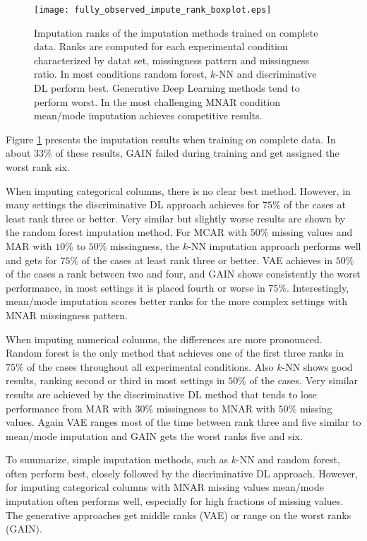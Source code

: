 \begin{figure}\centering
    \texttt{[image: fully\_observed\_impute\_rank\_boxplot.eps]}
    \caption[Imputation Ranks - Fully Observed]{Imputation ranks of the  imputation methods trained on complete data. Ranks are computed for each experimental condition characterized by datat set, missingness pattern and missingness ratio. In most conditions random forest, $k$-NN and discriminative DL perform best. Generative Deep Learning methods tend to perform worst. In the most challenging MNAR condition mean/mode imputation achieves competitive results.
	}
	\label{fig:fully_observed_impute_rank_boxplot}
\end{figure}


Figure \ref{fig:fully_observed_impute_rank_boxplot} presents the imputation results when training on complete data. In about $33\%$ of these results, GAIN failed during training and get assigned the worst rank six.

When imputing categorical columns, there is no clear best method. However, in many settings the discriminative DL approach achieves for $75\%$ of the cases at least rank three or better. Very similar but slightly worse results are shown by the random forest imputation method. For MCAR with $50\%$ missing values and MAR with $10\%$ to $50\%$ missingness, the $k$-NN imputation approach performs well and gets for $75\%$ of the cases at least rank three or better. VAE achieves in $50\%$ of the cases a rank between two and four, and GAIN shows consistently the worst performance, in most settings it is placed fourth or worse in $75\%$. Interestingly, mean/mode imputation scores better ranks for the more complex settings with MNAR missingness pattern.

When imputing numerical columns, the differences are more pronounced. Random forest is the only method that achieves one of the first three ranks in $75\%$ of the cases throughout all experimental conditions. Also $k$-NN shows good results, ranking second or third in most settings in $50\%$ of the cases. Very similar results are achieved by the discriminative DL method that tends to lose performance from MAR with $30\%$ missingness to MNAR with $50\%$ missing values. Again VAE ranges most of the time between rank three and five similar to mean/mode imputation and GAIN gets the worst ranks five and six.

To summarize, simple imputation methods, such as $k$-NN and random forest, often perform best, closely followed by the discriminative DL approach. However, for imputing categorical columns with MNAR missing values mean/mode imputation often performs well, especially for high fractions of missing values. The generative approaches get middle ranks (VAE) or range on the worst ranks (GAIN).

